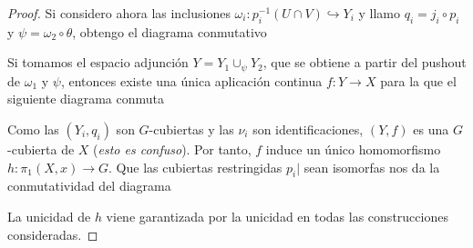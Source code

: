 \documentclass[12pt,a4paper]{book}
\theoremstyle{definition} \newtheorem{defn}[thm]{Definición}
\theoremstyle{definition} \newtheorem{ejemplo}[thm]{Ejemplo}
\theoremstyle{definition} \newtheorem{ejercicio}[thm]{Ejercicio}
\theoremstyle{remark} \newtheorem*{obs}{Observación}
\def\gf{\pi_1}
\begin{document}
\begin{proof}
Si considero ahora las inclusiones $\omega_i:p_i^{-1}(U\cap V) \hookrightarrow Y_i$ y llamo $q_i=j_i\circ p_i$ y $\psi=\omega_2\circ \theta$, obtengo el diagrama conmutativo
 \begin{center}
 \end{center}
   Si tomamos el espacio adjunción $Y=Y_1\cup_{\psi}Y_2$, que se obtiene a partir del pushout de $\omega_1$ y $\psi$, entonces existe una única aplicación continua $f:Y\rightarrow X$ para la que el siguiente diagrama conmuta
 \begin{center}
 \end{center}
 Como las $(Y_i,q_i)$ son $G$-cubiertas y las $\nu_i$ son identificaciones, $(Y,f)$ es una $G$-cubierta de $X$ (\textit{esto es confuso}). Por tanto, $f$ induce un único homomorfismo $h:\gf(X,x)\rightarrow G$. Que las cubiertas restringidas $p_i|$ sean isomorfas nos da la conmutatividad del diagrama
 \begin{center}
 \end{center}
 La unicidad de $h$ viene garantizada por la unicidad en todas las construcciones consideradas.
 \end{proof}
\end{document}
